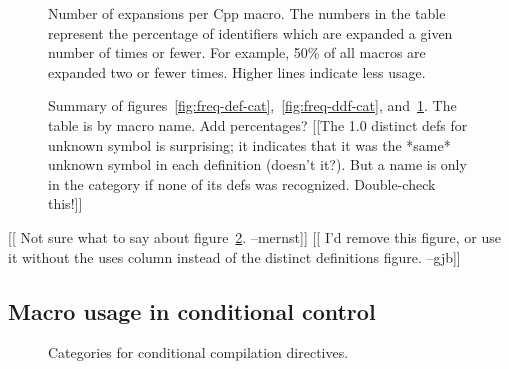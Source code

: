 \documentclass[10pt]{article}
\newcommand{\pkg}[1]{\textsf{#1}}
\begin{document}
\begin{figure}
\centerline{}
\caption{Number of expansions per Cpp macro.  The numbers in the
  table represent the percentage of identifiers which are expanded a given
  number of times or fewer.  For example, 50\% of all
  macros are expanded two or fewer times. Higher lines indicate less usage.}
\label{fig:freq-use-cat}
\end{figure}


\begin{figure}
  {\small\centerline{}}
  
  \caption{Summary of
    figures~\ref{fig:freq-def-cat},~\ref{fig:freq-ddf-cat},
    and~\ref{fig:freq-use-cat}.  The table is by macro name.  Add percentages?
    [[The 1.0 distinct defs for unknown symbol is surprising; it indicates
    that it was the *same* unknown symbol in each definition (doesn't
    it?).  But a name is only in the category if none of its defs was
    recognized.  Double-check this!]]}
  \label{fig:freq-sum-cat}
\end{figure}

[[ Not sure what to say about figure~\ref{fig:freq-sum-cat}. --mernst]]
[[ I'd remove this figure, or use it without the uses column instead of
the distinct definitions figure. --gjb]]

\subsection{Macro usage in conditional control}

\begin{figure}
\centerline{}
\caption{Categories for conditional compilation directives.}
\label{fig:ccd-categories}
\end{figure}
\end{document}

